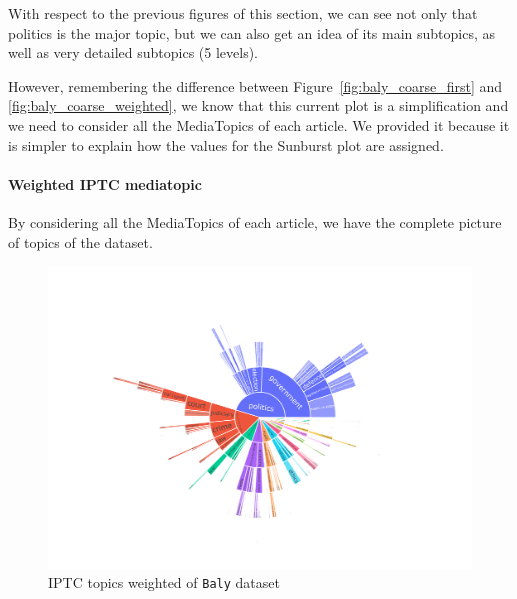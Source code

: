 With respect to the previous figures of this section, we can see not only that politics is the major topic, but we can also get an idea of its main subtopics, as well as very detailed subtopics (5 levels).

However, remembering the difference between Figure~\ref{fig:baly_coarse_first} and \ref{fig:baly_coarse_weighted}, we know that this current plot is a simplification and we need to consider all the MediaTopics of each article.
We provided it because it is simpler to explain how the values for the Sunburst plot are assigned.




\paragraph{Weighted IPTC mediatopic}

By considering all the MediaTopics of each article, we have the complete picture of topics of the dataset. 

\begin{figure}[!htbp]
    \centering
    \includegraphics[width=\linewidth]{figures/baly_iptc_weighted.pdf}
    \caption{IPTC topics weighted of \texttt{Baly} dataset}
    \label{fig:baly_iptc_weighted}
\end{figure}

